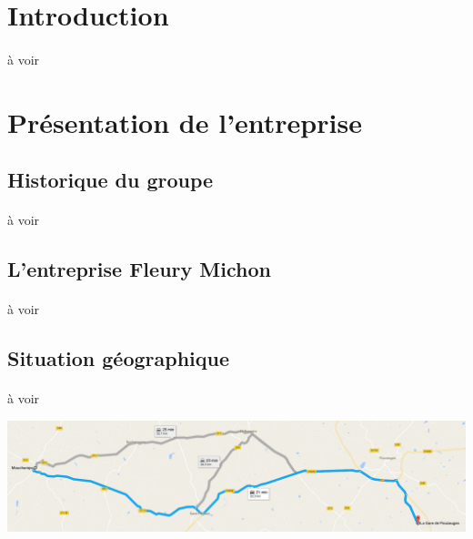\documentclass[a4paper,12pt]{extarticle}
\begin{document}
\clearpage

\section{Introduction}

\paragraph{}
à voir\\

\clearpage

\section{Présentation de l’entreprise}

\subsection{Historique du groupe}

\paragraph{}
à voir\\

\subsection{L’entreprise Fleury Michon}

\paragraph{}
à voir\\

\subsection{Situation géographique}

\paragraph{}
à voir\\

\centerline{\includegraphics[scale=0.40]{Img/Img_SituationGeo}}
\end{document}
